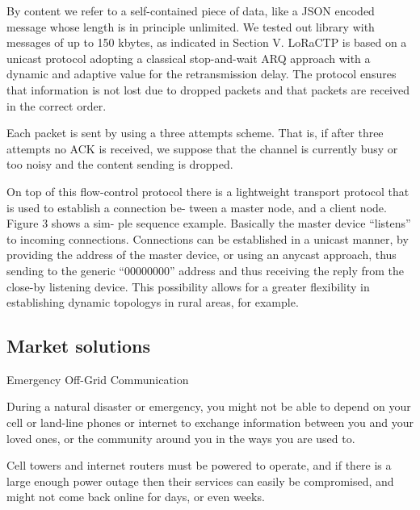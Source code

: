 		By content we refer to a self-contained piece of data, like a
		JSON encoded message whose length is in principle unlimited.
		We tested out library with messages of up to 150 kbytes,
		as indicated in Section V. LoRaCTP is based on a unicast
		protocol adopting a classical stop-and-wait ARQ approach
		with a dynamic and adaptive value for the retransmission
		delay. The protocol ensures that information is not lost due to
		dropped packets and that packets are received in the correct
		order.
		
		Each packet is sent by using a three attempts scheme. That
		is, if after three attempts no ACK is received, we suppose
		that the channel is currently busy or too noisy and the content
		sending is dropped.
		
		On top of this ﬂow-control protocol there is a lightweight
		transport protocol that is used to establish a connection be-
		tween a master node, and a client node. Figure 3 shows a sim-
		ple sequence example. Basically the master device “listens”
		to incoming connections. Connections can be established in a
		unicast manner, by providing the address of the master device,
		or using an anycast approach, thus sending to the generic
		“00000000” address and thus receiving the reply from the
		close-by listening device. This possibility allows for a greater
		ﬂexibility in establishing dynamic topologys in rural areas, for
		example.
		

		\subsection{Market solutions}
		
			Emergency Off-Grid Communication
			
			
			
			During a natural disaster or emergency, you might not be able to depend on your cell or land-line phones or internet to exchange information between you and your loved ones, or the community around you in the ways you are used to.
			
			Cell towers and internet routers must be powered to operate, and if there is a large enough power outage then their services can easily be compromised, and might not come back online for days, or even weeks.
		
